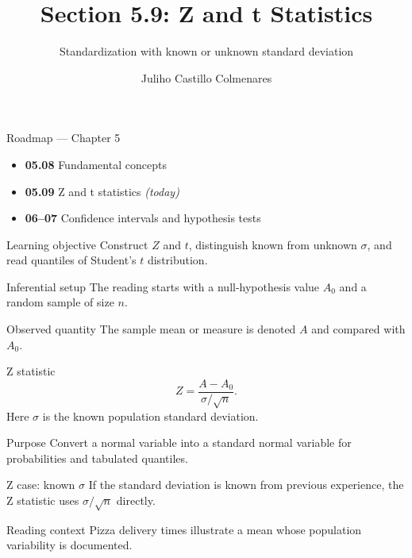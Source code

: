 \documentclass[10pt,aspectratio=169]{beamer}
\title[Z and t Statistics]{Section 5.9: Z and t Statistics}
\subtitle{Standardization with known or unknown standard deviation}
\author[J. Castillo Colmenares]{Juliho Castillo Colmenares}
\institute{Tecnológico de Monterrey}
\date{}
\begin{document}
\begin{frame}[plain]\vspace{-0.8cm}\titlepage\end{frame}

\begin{frame}{Roadmap --- Chapter 5}
  \footnotesize
  \begin{itemize}\itemsep=0.08cm
    \item \textbf{05.08} Fundamental concepts
    \item \textbf{05.09} Z and t statistics \emph{(today)}
    \item \textbf{06--07} Confidence intervals and hypothesis tests
  \end{itemize}
  \begin{block}{Learning objective}
    Construct $Z$ and $t$, distinguish known from unknown $\sigma$, and read
    quantiles of Student's $t$ distribution.
  \end{block}
\end{frame}

\begin{frame}{Inferential setup}
  \footnotesize
  The reading starts with a null-hypothesis value $A_0$ and a random sample of
  size $n$.
  \begin{block}{Observed quantity}
    The sample mean or measure is denoted $A$ and compared with $A_0$.
  \end{block}
\end{frame}

\begin{frame}{Z statistic}
  \footnotesize
  \[
    Z=\frac{A-A_0}{\sigma/\sqrt n}.
  \]
  Here $\sigma$ is the known population standard deviation.
  \begin{alertblock}{Purpose}
    Convert a normal variable into a standard normal variable for probabilities
    and tabulated quantiles.
  \end{alertblock}
\end{frame}

\begin{frame}{Z case: known $\sigma$}
  \footnotesize
  If the standard deviation is known from previous experience, the Z statistic
  uses $\sigma/\sqrt n$ directly.
  \begin{exampleblock}{Reading context}
    Pizza delivery times illustrate a mean whose population variability is
    documented.
  \end{exampleblock}
\end{frame}
\end{document}
